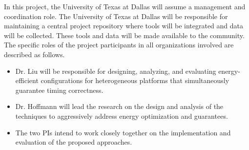 \documentclass[10pt,letterpaper]{article}
\begin{document}
 In this project, the University of Texas at Dallas will assume a management and coordination role. The University of Texas at Dallas will be responsible for maintaining a central project repository where tools will be integrated and data will be collected. These tools and data will be made available to the community. The specific roles of the project participants in all organizations involved are described as follows.
\begin{itemize}
\item Dr. Liu will be responsible for designing, analyzing, and evaluating energy-efficient configurations for heterogeneous platforms that simultaneously guarantee timing correctness.
\item Dr. Hoffmann will lead the research on the design and analysis of the techniques to aggressively address energy optimization and guarantees. 
\item The two PIs intend to  work closely together on the implementation and evaluation of the proposed approaches.
\end{itemize}


\end{document}

